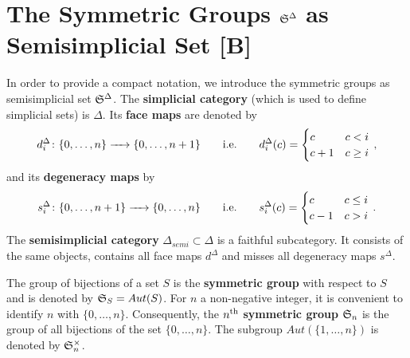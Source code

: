 \section{The Symmetric Groups \texorpdfstring{$\mathfrak S^\Delta$}{SDelta} as Semisimplicial Set [B]}
\label{notation:semi_simpl_sym_grp}
In order to provide a compact notation, we introduce the symmetric groups as semisimplicial set $\mathfrak S^\Delta$.
\label{page:simplicial_category}%
The {\bf simplicial category} (which is used to define simplicial sets) is $\Delta$.
\label{page:simplicial_face}%
Its {\bf face maps} are denoted by
\[
    d^\Delta_i \colon \{0, \ldots, n\} \to \{0, \ldots, n+1\} \mspc{i.e.}{20} d^\Delta_i(c) = \begin{cases} c & c < i \\ c+1 & c \ge i \end{cases}\,,
\]
\label{page:simplicial_degeneracy}%
and its {\bf degeneracy maps} by
\[
    s^\Delta_i \colon \{0, \ldots, n+1\} \to \{0, \ldots, n\} \mspc{i.e.}{20} s^\Delta_i(c) = \begin{cases} c & c \le i \\ c-1 & c > i \end{cases} \,.
\]
\label{page:semisimplicial_category}%
The {\bf semisimplicial category} $\Delta_{semi} \subset \Delta$ is a faithful subcategory.
It consists of the same objects, contains all face maps $d^\Delta$ and misses all degeneracy maps $s^\Delta$.

\begin{defi}
    \label{notation:sym_grp}
    The group of bijections of a set $S$ is the {\bf symmetric group} with respect to $S$ and is denoted by $\mathfrak S_{S} = Aut(S)$.
    For $n$ a non-negative integer, it is convenient to identify $n$ with $\{0, \ldots, n\}$.
    Consequently, the $n^{\text{th}}$ {\bf symmetric group} $\mathfrak S_n$ is the group of all bijections of the set $\{ 0, \ldots, n\}$.
    The subgroup $Aut(\{ 1, \ldots, n\})$ is denoted by $\mathfrak S_n^\times$.
\end{defi}


